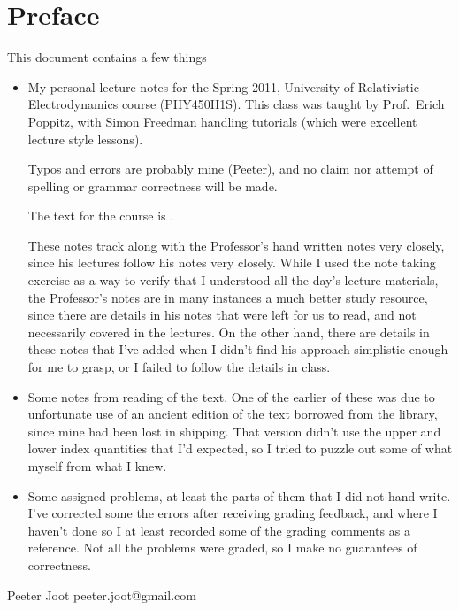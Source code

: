 \chapter*{Preface}\normalsize

This document contains a few things

\begin{itemize}
\item My personal lecture notes for the Spring 2011, University of Relativistic Electrodynamics course (PHY450H1S).  This class was taught by Prof.\ Erich Poppitz, with Simon Freedman handling tutorials (which were excellent lecture style lessons).

Typos and errors are probably mine (Peeter), and no claim nor attempt of spelling or grammar correctness will be made.  

The text for the course is \citep{landau1980classical}.

These notes track along with the Professor's hand written notes very closely, since his lectures follow his notes very closely.  While I used the note taking exercise as a way to verify that I understood all the day's lecture materials, the Professor's notes are in many instances a much better study resource, since there are details in his notes that were left for us to read, and not necessarily covered in the lectures.  On the other hand, there are details in these notes that I've added when I didn't find his approach simplistic enough for me to grasp, or I failed to follow the details in class.

\item Some notes from reading of the text.  One of the earlier of these was due to unfortunate use of an ancient edition of the text borrowed from the library, since mine had been lost in shipping.  That version didn't use the upper and lower index quantities that I'd expected, so I tried to puzzle out some of what myself from what I knew.

\item Some assigned problems, at least the parts of them that I did not hand write.  I've corrected some the errors after receiving grading feedback, and where I haven't done so I at least recorded some of the grading comments as a reference.  Not all the problems were graded, so I make no guarantees of correctness.

%
\end{itemize}

Peeter Joot  \quad peeter.joot@gmail.com 
